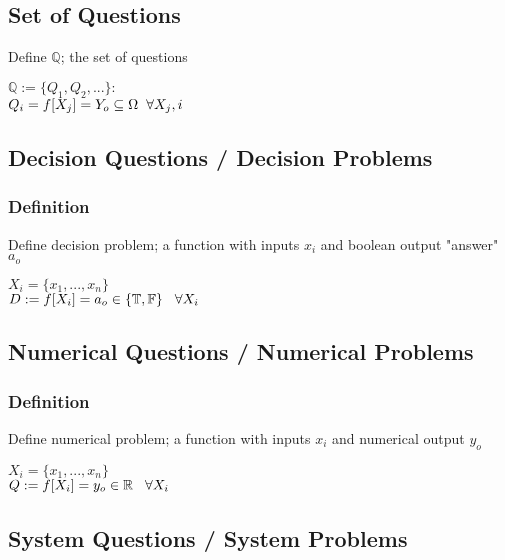 \documentclass[11pt]{article}
\begin{document}
\subsection{Set of Questions}
Define $\mathbb{Q}$; the set of questions
\begin{center}
$
\mathbb{Q} := \{Q_1,Q_2,...\}:
$
\\ \vspace{2mm}
$
Q_i = f[X_j] = Y_o \subseteq \Omega \hspace{2mm} \forall X_j, i
$
\end{center}

\subsection{Decision Questions / Decision Problems}
\subsubsection{Definition}
Define decision problem; a function with inputs $x_i$ and boolean output "answer" $a_o$
\begin{center}
$
X_i = \{x_1,...,x_n\}
$
\\ \vspace{2mm}
$
D := f \lbrack X_i \rbrack = a_{o} \in \{\mathbb{T}, \mathbb{F}\} \hspace{3mm} \forall X_i
$
\end{center}



\subsection{Numerical Questions / Numerical Problems}

\subsubsection{Definition}
Define numerical problem; a function with inputs $x_i$ and numerical output $y_o$
\begin{center}
$
X_i = \{x_1,...,x_n\}
$
\\ \vspace{2mm}
$
Q := f \lbrack X_i \rbrack = y_{o} \in \mathbb{R} \hspace{3mm} \forall X_i
$
\end{center}



\subsection{System Questions / System Problems}
\end{document}
